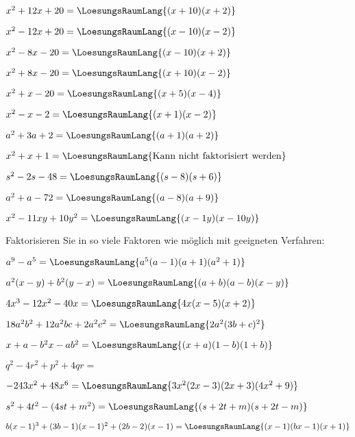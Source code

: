 \begin{bbwAufgabenBlock}
\item $x^2 + 12x + 20 = \LoesungsRaumLang{(x+10)(x+2)}$
\item $x^2 - 12x + 20 = \LoesungsRaumLang{(x-10)(x-2)}$
\item $x^2 - 8x - 20 = \LoesungsRaumLang{(x-10)(x+2)}$
\item $x^2 + 8x - 20 = \LoesungsRaumLang{(x+10)(x-2)}$\newpage
\item $x^2 + x - 20 = \LoesungsRaumLang{(x+5)(x-4)}$
\item $x^2 - x - 2 = \LoesungsRaumLang{(x+1)(x-2)}$
\item $a^2+3a+2 = \LoesungsRaumLang{(a+1)(a+2)}$
\item $x^2 + x + 1 = \LoesungsRaumLang{\textrm{Kann nicht faktorisiert werden}}$\newpage
\item $s^2 -2s - 48 = \LoesungsRaumLang{(s-8)(s+6)}$
\item $a^2 + a - 72 = \LoesungsRaumLang{(a-8)(a+9)}$
\item $x^2 - 11xy + 10y^2 = \LoesungsRaumLang{(x-1y)(x-10y)}$
\end{bbwAufgabenBlock}

\newpage


Faktorisieren Sie in so viele Faktoren wie möglich
mit geeigneten Verfahren:


\begin{bbwAufgabenBlock}
\item $a^9-a^5 = \LoesungsRaumLang{a^5(a-1)(a+1)(a^2+1)}$
\item $a^2(x-y) + b^2(y-x) =\LoesungsRaumLang{(a+b)(a-b)(x-y)}$
\item $4x^3-12x^2-40x = \LoesungsRaumLang{4x(x-5)(x+2)}$
\item $18a^2b^2+12a^2bc + 2a^2c^2 = \LoesungsRaumLang{2a^2(3b+c)^2}$\newpage
\item $x+a-b^2x-ab^2 = \LoesungsRaumLang{(x+a)(1-b)(1+b)}$
\item $q^2-4r^2+p^2 + 4qr = $
\item $-243x^2 + 48x^6 = \LoesungsRaumLang{3x^2(2x-3)(2x+3)(4x^2+9)}$
\item $s^2+4t^2-(4st+m^2) = \LoesungsRaumLang{(s+2t+m)(s+2t-m)}$\newpage
\item $b(x-1)^3 + (3b-1)(x-1)^2 + (2b-2)(x-1) = \LoesungsRaumLang{(x-1)(bx-1)(x+1)}$
\end{bbwAufgabenBlock}






